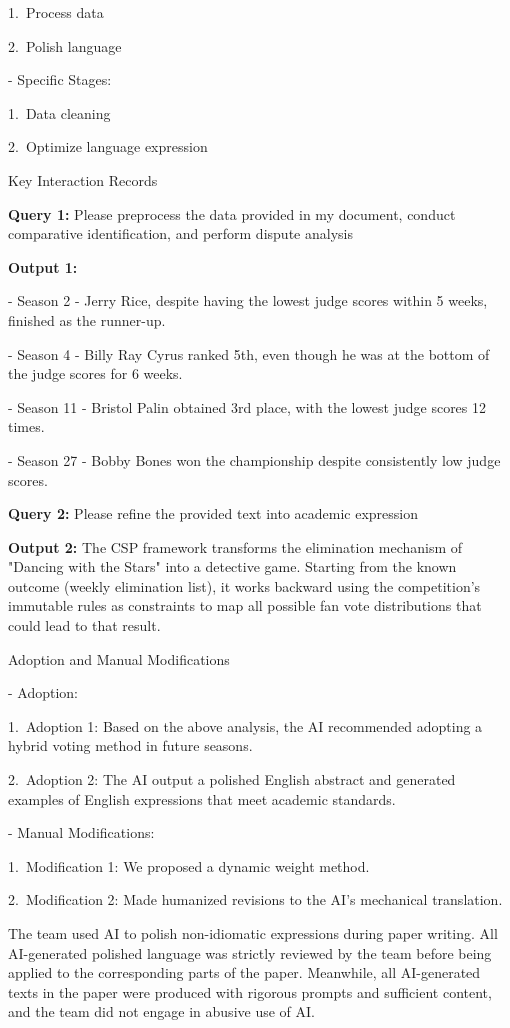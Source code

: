 \documentclass{mcmthesis}
\begin{document}
1. Process data

2. Polish language

- Specific Stages:

1. Data cleaning

2. Optimize language expression
 
Key Interaction Records
 
\textbf{Query 1:} Please preprocess the data provided in my document, conduct comparative identification, and perform dispute analysis

\textbf{Output 1:}

- Season 2 - Jerry Rice, despite having the lowest judge scores within 5 weeks, finished as the runner-up.

- Season 4 - Billy Ray Cyrus ranked 5th, even though he was at the bottom of the judge scores for 6 weeks.

- Season 11 - Bristol Palin obtained 3rd place, with the lowest judge scores 12 times.

- Season 27 - Bobby Bones won the championship despite consistently low judge scores.

\textbf{Query 2:} Please refine the provided text into academic expression

\textbf{Output 2:} The CSP framework transforms the elimination mechanism of "Dancing with the Stars" into a detective game. Starting from the known outcome (weekly elimination list), it works backward using the competition's immutable rules as constraints to map all possible fan vote distributions that could lead to that result.
 
Adoption and Manual Modifications
 
- Adoption:

1. Adoption 1: Based on the above analysis, the AI recommended adopting a hybrid voting method in future seasons.

2. Adoption 2: The AI output a polished English abstract and generated examples of English expressions that meet academic standards.

- Manual Modifications:

1. Modification 1: We proposed a dynamic weight method.

2. Modification 2: Made humanized revisions to the AI's mechanical translation.
 
The team used AI to polish non-idiomatic expressions during paper writing. All AI-generated polished language was strictly reviewed by the team before being applied to the corresponding parts of the paper. Meanwhile, all AI-generated texts in the paper were produced with rigorous prompts and sufficient content, and the team did not engage in abusive use of AI.
\end{document}
